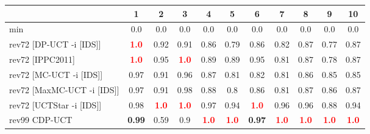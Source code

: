 \documentclass{article}
\begin{document}
\begin{tabular}{|l|r@{$\pm$}rr@{$\pm$}rr@{$\pm$}rr@{$\pm$}rr@{$\pm$}rr@{$\pm$}rr@{$\pm$}rr@{$\pm$}rr@{$\pm$}rr@{$\pm$}r|}
\hline

& \multicolumn{2}{c}{1}
& \multicolumn{2}{c}{2}
& \multicolumn{2}{c}{3}
& \multicolumn{2}{c}{4}
& \multicolumn{2}{c}{5}
& \multicolumn{2}{c}{6}
& \multicolumn{2}{c}{7}
& \multicolumn{2}{c}{8}
& \multicolumn{2}{c}{9}
& \multicolumn{2}{c|}{10}
\\
\hline
\hline
min
& \multicolumn{2}{c}{0.0}
& \multicolumn{2}{c}{0.0}
& \multicolumn{2}{c}{0.0}
& \multicolumn{2}{c}{0.0}
& \multicolumn{2}{c}{0.0}
& \multicolumn{2}{c}{0.0}
& \multicolumn{2}{c}{0.0}
& \multicolumn{2}{c}{0.0}
& \multicolumn{2}{c}{0.0}
& \multicolumn{2}{c|}{0.0}
\\
rev72 [DP-UCT -i [IDS]]
& \multicolumn{2}{c}{\textbf{\textcolor{red}{1.0}}}
& \multicolumn{2}{c}{0.92}
& \multicolumn{2}{c}{0.91}
& \multicolumn{2}{c}{0.86}
& \multicolumn{2}{c}{0.79}
& \multicolumn{2}{c}{0.86}
& \multicolumn{2}{c}{0.82}
& \multicolumn{2}{c}{0.87}
& \multicolumn{2}{c}{0.77}
& \multicolumn{2}{c|}{0.87}
\\
rev72 [IPPC2011]
& \multicolumn{2}{c}{\textbf{\textcolor{red}{1.0}}}
& \multicolumn{2}{c}{0.95}
& \multicolumn{2}{c}{\textbf{\textcolor{red}{1.0}}}
& \multicolumn{2}{c}{0.89}
& \multicolumn{2}{c}{0.89}
& \multicolumn{2}{c}{0.95}
& \multicolumn{2}{c}{0.81}
& \multicolumn{2}{c}{0.87}
& \multicolumn{2}{c}{0.78}
& \multicolumn{2}{c|}{0.87}
\\
rev72 [MC-UCT -i [IDS]]
& \multicolumn{2}{c}{0.97}
& \multicolumn{2}{c}{0.91}
& \multicolumn{2}{c}{0.96}
& \multicolumn{2}{c}{0.87}
& \multicolumn{2}{c}{0.81}
& \multicolumn{2}{c}{0.82}
& \multicolumn{2}{c}{0.81}
& \multicolumn{2}{c}{0.86}
& \multicolumn{2}{c}{0.85}
& \multicolumn{2}{c|}{0.85}
\\
rev72 [MaxMC-UCT -i [IDS]]
& \multicolumn{2}{c}{0.97}
& \multicolumn{2}{c}{0.91}
& \multicolumn{2}{c}{0.98}
& \multicolumn{2}{c}{0.88}
& \multicolumn{2}{c}{0.8}
& \multicolumn{2}{c}{0.86}
& \multicolumn{2}{c}{0.81}
& \multicolumn{2}{c}{0.87}
& \multicolumn{2}{c}{0.86}
& \multicolumn{2}{c|}{0.87}
\\
rev72 [UCTStar -i [IDS]]
& \multicolumn{2}{c}{0.98}
& \multicolumn{2}{c}{\textbf{\textcolor{red}{1.0}}}
& \multicolumn{2}{c}{\textbf{\textcolor{red}{1.0}}}
& \multicolumn{2}{c}{0.97}
& \multicolumn{2}{c}{0.94}
& \multicolumn{2}{c}{\textbf{\textcolor{red}{1.0}}}
& \multicolumn{2}{c}{0.96}
& \multicolumn{2}{c}{0.96}
& \multicolumn{2}{c}{0.88}
& \multicolumn{2}{c|}{0.94}
\\
\hline
rev99 CDP-UCT
& \multicolumn{2}{c}{\textbf{0.99}}
& \multicolumn{2}{c}{0.59}
& \multicolumn{2}{c}{0.9}
& \multicolumn{2}{c}{\textbf{\textcolor{red}{1.0}}}
& \multicolumn{2}{c}{\textbf{\textcolor{red}{1.0}}}
& \multicolumn{2}{c}{\textbf{0.97}}
& \multicolumn{2}{c}{\textbf{\textcolor{red}{1.0}}}
& \multicolumn{2}{c}{\textbf{\textcolor{red}{1.0}}}
& \multicolumn{2}{c}{\textbf{\textcolor{red}{1.0}}}
& \multicolumn{2}{c|}{\textbf{\textcolor{red}{1.0}}}
\\
\hline
\end{tabular}%
\end{document}
